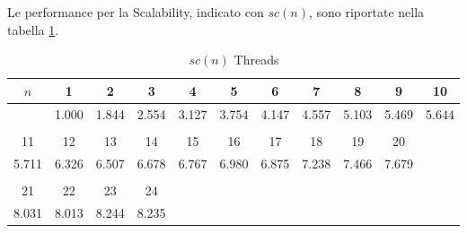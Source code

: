 \documentclass[12pt]{article}
\begin{document}
Le performance per la Scalability, indicato con $sc(n)$, sono riportate nella tabella \ref{ffsc1}.
\begin{table}[!htbp]
\centering
\caption{$sc(n)$ Threads}
\label{ffsc1}
\begin{tabular}{c c c c c c c c c c c }
$n$ & 1 & 2 & 3 & 4 & 5 & 6 & 7 & 8 & 9 & 10   \\ \hline
& 1.000 & 1.844 & 2.554 & 3.127 & 3.754 & 4.147 & 4.557 & 5.103 & 5.469 & 5.644
 \\ \\
11 & 12 & 13 & 14 & 15 & 16 & 17 & 18 & 19 & 20 \\ \hline
5.711 & 6.326 & 6.507 & 6.678 & 6.767 & 6.980 & 6.875 & 7.238 & 7.466 & 7.679
 \\ \\
21 & 22 & 23 & 24 \\ \hline
8.031 & 8.013 & 8.244 & 8.235
\end{tabular}
\end{table}
\end{document}

